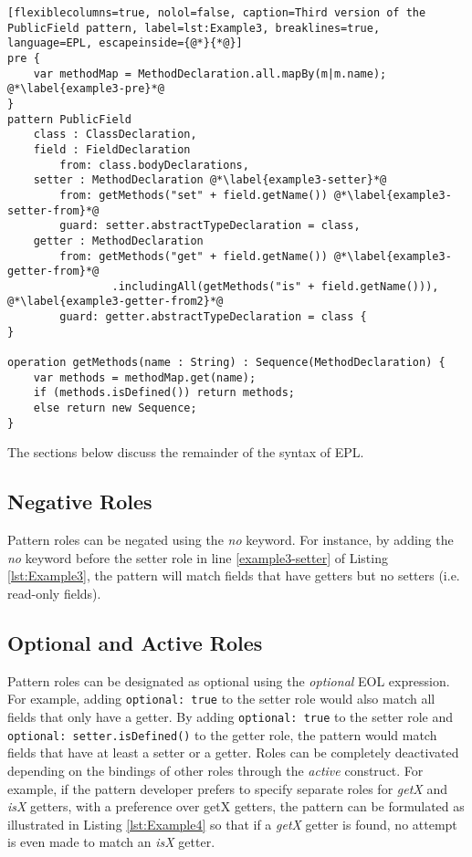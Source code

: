 \begin{lstlisting}[flexiblecolumns=true, nolol=false, caption=Third version of the PublicField pattern, label=lst:Example3, breaklines=true, language=EPL, escapeinside={@*}{*@}]
pre {
	var methodMap = MethodDeclaration.all.mapBy(m|m.name); @*\label{example3-pre}*@
}
pattern PublicField
	class : ClassDeclaration,
	field : FieldDeclaration
		from: class.bodyDeclarations,
	setter : MethodDeclaration @*\label{example3-setter}*@
		from: getMethods("set" + field.getName()) @*\label{example3-setter-from}*@
		guard: setter.abstractTypeDeclaration = class,
	getter : MethodDeclaration
		from: getMethods("get" + field.getName()) @*\label{example3-getter-from}*@
				.includingAll(getMethods("is" + field.getName())),  @*\label{example3-getter-from2}*@
		guard: getter.abstractTypeDeclaration = class {
}

operation getMethods(name : String) : Sequence(MethodDeclaration) {
	var methods = methodMap.get(name);
	if (methods.isDefined()) return methods;
	else return new Sequence;
}
\end{lstlisting}

The sections below discuss the remainder of the syntax of EPL.

\subsection{Negative Roles}
Pattern roles can be negated using the \emph{no} keyword. For instance, by adding the \emph{no} keyword before the setter role in line \ref{example3-setter} of Listing \ref{lst:Example3}, the pattern will match fields that have getters but no setters (i.e. read-only fields).

\subsection{Optional and Active Roles}
Pattern roles can be designated as optional using the \emph{optional} EOL expression. For example, adding \texttt{optional: true} to the setter role would also match all fields that only have a getter. By adding \texttt{optional: true} to the setter role and \texttt{optional: setter.isDefined()} to the getter role, the pattern would match fields that have at least a setter or a getter. Roles can be completely deactivated depending on the bindings of other roles through the \emph{active} construct. For example, if the pattern developer prefers to specify separate roles for \emph{getX} and \emph{isX} getters, with a preference over getX getters, the pattern can be formulated as illustrated in Listing \ref{lst:Example4} so that if a \emph{getX} getter is found, no attempt is even made to match an \emph{isX} getter.

